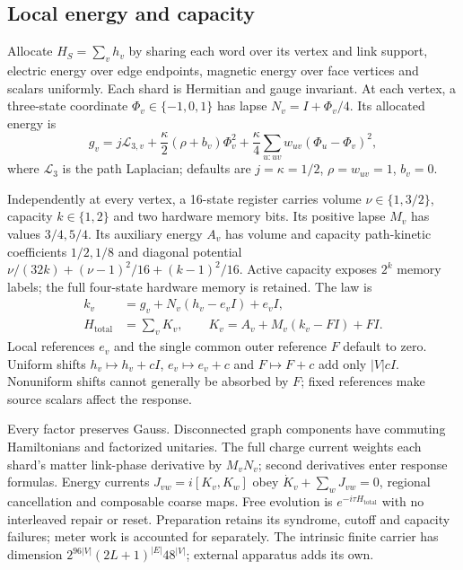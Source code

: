 \subsection{Local energy and capacity}
\label{sec:common-total-energy}

Allocate $H_S=\sum_vh_v$ by sharing each word over its vertex and link
support, electric energy over edge endpoints, magnetic energy over face
vertices and scalars uniformly. Each shard is Hermitian and gauge invariant.
At each vertex, a three-state coordinate $\Phi_v\in\{-1,0,1\}$ has
lapse $N_v=I+\Phi_v/4$. Its allocated energy is
\[
 g_v=j\mathcal L_{3,v}+\frac\kappa2(\rho+b_v)\Phi_v^2
       +\frac\kappa4\sum_{u:uv}w_{uv}(\Phi_u-\Phi_v)^2,
\]
where $\mathcal L_3$ is the path Laplacian; defaults are
$j=\kappa=1/2$, $\rho=w_{uv}=1$, $b_v=0$.

Independently at every vertex, a 16-state register carries volume
$\nu\in\{1,3/2\}$, capacity $k\in\{1,2\}$ and two hardware memory bits.
Its positive lapse $M_v$ has values $3/4,5/4$. Its auxiliary energy $A_v$
has volume and capacity path-kinetic coefficients $1/2,1/8$ and diagonal
potential $\nu/(32k)+(\nu-1)^2/16+(k-1)^2/16$.
Active capacity exposes $2^k$ memory labels; the full four-state hardware
memory is retained. The law is
\begin{align}
 k_v&=g_v+N_v(h_v-e_vI)+e_vI,\nonumber\\
 H_{\mathrm{total}}&=\sum_vK_v,\qquad
 K_v=A_v+M_v(k_v-FI)+FI.\label{eq:common-total-law}
\end{align}
Local references $e_v$ and the single common outer reference $F$ default
to zero. Uniform shifts $h_v\mapsto h_v+cI$, $e_v\mapsto e_v+c$ and
$F\mapsto F+c$ add only $|V|cI$. Nonuniform shifts cannot generally be
absorbed by $F$; fixed references make source scalars affect the response.

Every factor preserves Gauss. Disconnected graph components have commuting
Hamiltonians and factorized unitaries. The full charge current weights each
shard's matter link-phase derivative by $M_vN_v$; second derivatives enter response
formulas. Energy currents $J_{vw}=i[K_v,K_w]$ obey
$\dot K_v+\sum_wJ_{vw}=0$, regional cancellation and composable coarse maps.
Free evolution is $e^{-i\tau H_{\mathrm{total}}}$ with no interleaved repair
or reset. Preparation retains its syndrome, cutoff and capacity failures;
meter work is accounted for separately. The intrinsic finite carrier has
dimension $2^{96|V|}(2L+1)^{|E|}48^{|V|}$; external apparatus adds its own.

